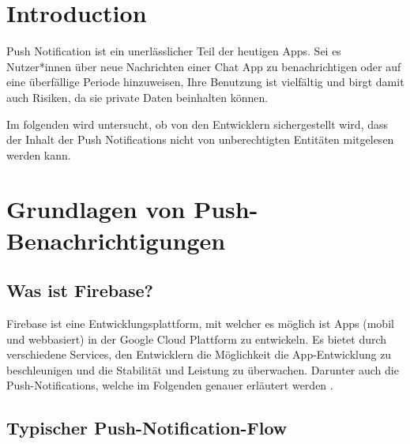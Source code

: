 \documentclass[sigconf]{acmart}
\begin{document}

\maketitle

\section{Introduction}

Push Notification ist ein unerlässlicher Teil der heutigen Apps. 
Sei es Nutzer*innen über neue Nachrichten einer Chat App 
zu benachrichtigen oder auf eine überfällige Periode hinzuweisen, 
Ihre Benutzung ist vielfältig und birgt damit auch Risiken, da sie 
private Daten beinhalten können.

Im folgenden wird untersucht, ob von den Entwicklern
sichergestellt wird, dass der Inhalt der
Push Notifications nicht von unberechtigten Entitäten mitgelesen 
werden kann.

\section{Grundlagen von Push-Benachrichtigungen}

\subsection{Was ist Firebase?}

Firebase ist eine Entwicklungsplattform, mit welcher es möglich ist 
Apps (mobil und webbasiert) in der Google Cloud Plattform zu entwickeln.
Es bietet durch verschiedene Services, den Entwicklern die Möglichkeit 
die App-Entwicklung zu beschleunigen und die Stabilität und Leistung 
zu überwachen. Darunter auch die Push-Notifications, welche im Folgenden 
genauer erläutert werden \cite{cloudwuerdig}.

\subsection{Typischer Push-Notification-Flow}
\end{document}
